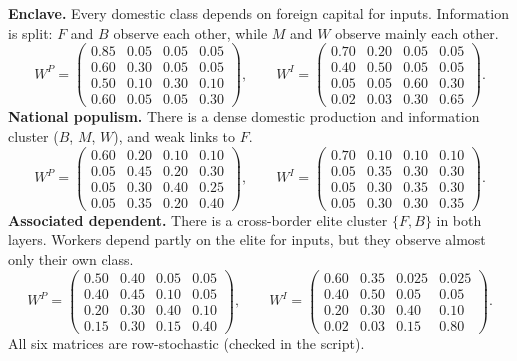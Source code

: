 \documentclass[../solutions_manual.tex]{subfiles}
\begin{document}
 \textbf{Enclave.} Every domestic class depends on foreign capital for inputs. Information is split: $F$ and $B$ observe each other, while $M$ and $W$ observe mainly each other.
\[
W^P = \begin{pmatrix} 0.85 & 0.05 & 0.05 & 0.05 \\ 0.60 & 0.30 & 0.05 & 0.05 \\ 0.50 & 0.10 & 0.30 & 0.10 \\ 0.60 & 0.05 & 0.05 & 0.30 \end{pmatrix},\qquad
W^I = \begin{pmatrix} 0.70 & 0.20 & 0.05 & 0.05 \\ 0.40 & 0.50 & 0.05 & 0.05 \\ 0.05 & 0.05 & 0.60 & 0.30 \\ 0.02 & 0.03 & 0.30 & 0.65 \end{pmatrix}.
\]
 \textbf{National populism.} There is a dense domestic production and information cluster ($B$, $M$, $W$), and weak links to $F$.
\[
W^P = \begin{pmatrix} 0.60 & 0.20 & 0.10 & 0.10 \\ 0.05 & 0.45 & 0.20 & 0.30 \\ 0.05 & 0.30 & 0.40 & 0.25 \\ 0.05 & 0.35 & 0.20 & 0.40 \end{pmatrix},\qquad
W^I = \begin{pmatrix} 0.70 & 0.10 & 0.10 & 0.10 \\ 0.05 & 0.35 & 0.30 & 0.30 \\ 0.05 & 0.30 & 0.35 & 0.30 \\ 0.05 & 0.30 & 0.30 & 0.35 \end{pmatrix}.
\]
 \textbf{Associated dependent.} There is a cross-border elite cluster $\{F, B\}$ in both layers. Workers depend partly on the elite for inputs, but they observe almost only their own class.
\[
W^P = \begin{pmatrix} 0.50 & 0.40 & 0.05 & 0.05 \\ 0.40 & 0.45 & 0.10 & 0.05 \\ 0.20 & 0.30 & 0.40 & 0.10 \\ 0.15 & 0.30 & 0.15 & 0.40 \end{pmatrix},\qquad
W^I = \begin{pmatrix} 0.60 & 0.35 & 0.025 & 0.025 \\ 0.40 & 0.50 & 0.05 & 0.05 \\ 0.20 & 0.30 & 0.40 & 0.10 \\ 0.02 & 0.03 & 0.15 & 0.80 \end{pmatrix}.
\]
All six matrices are row-stochastic (checked in the script).
\end{document}
